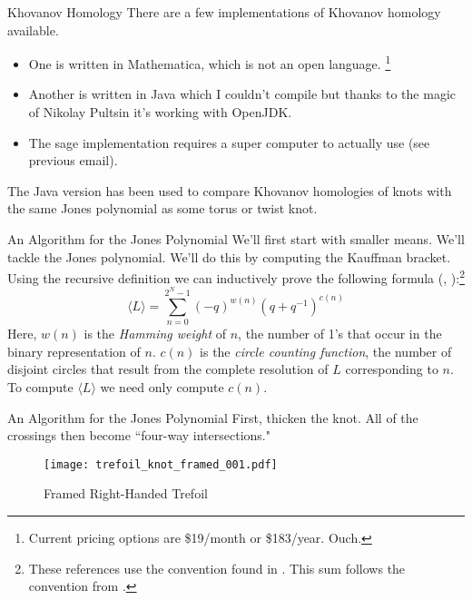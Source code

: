 \documentclass{beamer}
\begin{document}
    \begin{frame}{Khovanov Homology}
        There are a few implementations of Khovanov homology available.
        \begin{itemize}
            \item One is written in Mathematica, which is not an open language.%
                  \footnote{Current pricing options are \$19/month
                            or \$183/year. Ouch.}
            \item Another is written in Java which I couldn't compile but thanks
                  to the magic of Nikolay Pultsin it's working with OpenJDK.
            \item The sage implementation requires a super computer to actually
                  use (see previous email).
        \end{itemize}
        The Java version has been used to compare Khovanov homologies of
        knots with the same Jones polynomial as some torus or twist knot.
    \end{frame}
    \begin{frame}{An Algorithm for the Jones Polynomial}
        We'll first start with smaller means. We'll tackle the Jones
        polynomial. We'll do this by computing the Kauffman bracket. Using the
        recursive definition we can inductively prove the following formula
        (\cite[p.~158]{AdamsTheKnotBook}, \cite[p.~10]{Liu2022ABI}):\footnote{%
            These references use the convention found in
            \cite{KauffmanStateModels}. This sum follows the convention
            from \cite{BarNatanKhovanovJones}.
        }
        \begin{equation}
            \label{eqn:kauffman_bracket}%
            \langle{L}\rangle=\sum_{n=0}^{2^{N}-1}
                (-q)^{w(n)}(q+q^{-1})^{c(n)}
        \end{equation}
        Here, $w(n)$ is the \textit{Hamming weight} of $n$, the number of 1's
        that occur in the binary representation of $n$. $c(n)$ is the
        \textit{circle counting function}, the number of disjoint circles that
        result from the complete resolution of $L$ corresponding to $n$.
        To compute $\langle{L}\rangle$ we need only compute $c(n)$.
    \end{frame}
    \begin{frame}{An Algorithm for the Jones Polynomial}
        First, thicken the knot. All of the crossings then become
        ``four-way intersections."
        \begin{figure}
            \centering
            \texttt{[image: trefoil\_knot\_framed\_001.pdf]}
            \caption{Framed Right-Handed Trefoil}
            \label{fig:trefoil_knot_framed_001}
        \end{figure}
    \end{frame}
\end{document}
